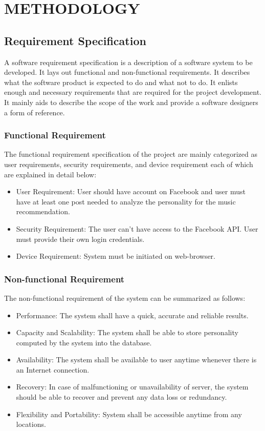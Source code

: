 \newpage
\section{METHODOLOGY}

\subsection{Requirement Specification}
A software requirement specification is a description of a software system to be developed. It lays out functional and non-functional requirements. It describes what the software product is expected to do and what not to do. It enlists enough and necessary requirements that are required for the project development. It mainly aids to describe the scope of the work and provide a software designers a form of reference.
\subsubsection{Functional Requirement}
The functional requirement specification of the project are mainly categorized as user requirements, security requirements, and device requirement each of which are explained in detail below:
\begin{itemize}
\item User Requirement: User should have account on Facebook and user must have at least one post needed to analyze the personality for the music recommendation.
\item Security Requirement: The user can't have access to the Facebook API. User must provide their own login credentials.
\item Device Requirement: System must be initiated on web-browser.

\end{itemize}
\subsubsection{Non-functional Requirement}
The non-functional requirement of the system can be summarized as follows:
\begin{itemize}
\item Performance: The system shall have a quick, accurate and reliable results.
\item Capacity and Scalability: The system shall be able to store personality computed by the system into the database.
\item Availability: The system shall be available to user anytime whenever there is an Internet connection.
\item Recovery: In case of malfunctioning or unavailability of server, the system should be able to recover and prevent any data loss or redundancy.
\item Flexibility and Portability: System shall be accessible anytime from any locations.
\end{itemize}
